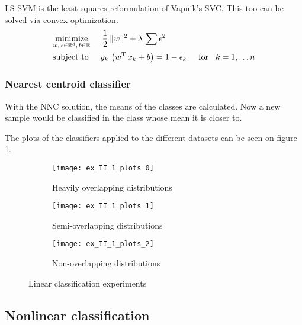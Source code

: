 LS-SVM is the least squares reformulation of Vapnik's SVC.
This too can be solved via convex optimization.
\begin{equation}
\begin{split}
	&\underset{w,\,\epsilon\in\mathbb{R}^d,\,b\in\mathbb{R}}{\operatorname{minimize}}\hspace{5mm}
		\frac{1}{2}\,\lVert w\rVert^2 + \lambda\,\sum\epsilon^2\\
	&\text{subject to}\hspace{5mm}
		y_k\,\left(w\textsuperscript{T}\,x_k + b\right) = 1-\epsilon_k\hspace{5mm}\text{for}\hspace{3mm} k=1,\dots n
\end{split}
\end{equation}

\subsubsection*{Nearest centroid classifier}

With the NNC solution, the means of the classes are calculated.
Now a new sample would be classified in the class whose mean
it is closer to.

The plots of the classifiers applied to the different datasets
can be seen on figure \ref{fig:linear-classification}.

\begin{figure}[H]
	\centering
	\begin{subfigure}{\textwidth}
		\centering
		\texttt{[image: ex\_II\_1\_plots\_0]}
		\caption{Heavily overlapping distributions}
	\end{subfigure}
	\begin{subfigure}{\textwidth}
		\centering
		\texttt{[image: ex\_II\_1\_plots\_1]}
		\caption{Semi-overlapping distributions}
	\end{subfigure}
	\begin{subfigure}{\textwidth}
		\centering
		\texttt{[image: ex\_II\_1\_plots\_2]}
		\caption{Non-overlapping distributions}
	\end{subfigure}
	\caption{Linear classification experiments}
	\label{fig:linear-classification}
\end{figure}


\subsection{Nonlinear classification}

